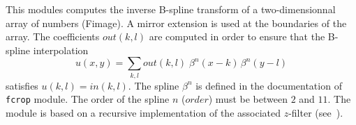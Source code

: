 This modules computes the inverse B-spline transform of a two-dimensionnal
array of numbers (Fimage). A mirror extension is used at the boundaries of
the array.
The coefficients $out(k,l)$ are computed in order to ensure that 
the B-spline interpolation
$$u(x,y) = \sum_{k,l} out(k,l) \;\beta^n(x-k) \, \beta^n(y-l)$$
satisfies $u(k,l)=in(k,l)$.
The spline $\beta^n$ is defined in the documentation of \verb+fcrop+ module.
The order of the spline $n$ ($order$) must be between $2$ and $11$.
The module is based on a recursive implementation of the associated $z$-filter
(see~\cite{thevenaz.blu.ea:image}\cite{unser.aldroubi.ea:fast}).
